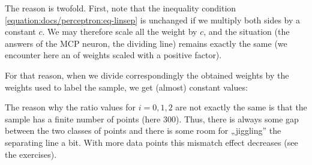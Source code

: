 \documentclass[a4paper,12pt,polish]{jupyterBook}
\begin{document}
\sphinxAtStartPar
The reason is twofold. First, note that the inequality condition \eqref{equation:docs/perceptron:eq-linsep} is unchanged if we multiply both sides by a  constant \(c\). We may therefore scale all the weight by \(c\), and the situation (the answers of the MCP neuron, the dividing line) remains exactly the same (we encounter here an  of weights scaled with a positive factor).

\sphinxAtStartPar
For that reason, when we divide correspondingly the obtained weights by the weights used to label the sample, we get (almost) constant values:
\begin{sphinxVerbatimInput}

\begin{sphinxVerbatim}[commandchars=\\\{\}]
\end{sphinxVerbatim}
\end{sphinxVerbatimInput}
\begin{sphinxVerbatimOutput}

\begin{sphinxVerbatim}[commandchars=\\\{\}]
[2.068 2.085 2.071]
\end{sphinxVerbatim}
\end{sphinxVerbatimOutput}

\sphinxAtStartPar
The reason why the ratio values for \(i=0,1,2\) are not exactly the same is that the sample has a finite number of points (here 300). Thus, there is always some gap between the two classes of points and there is some room for „jiggling” the separating line a bit. With more data points this mismatch effect decreases (see the exercises).
\end{document}
